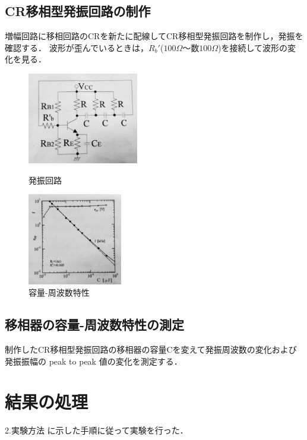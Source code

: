 \documentclass[10pt, a4j, dvipdfmx]{jarticle}
\begin{document}
      \subsection*{CR移相型発振回路の制作}
      増幅回路に移相回路のCRを新たに配線してCR移相型発振回路を制作し，発振を確認する．
      波形が歪んでいるときは，$R_b'$($100\Omega$〜数$100\Omega$)を接続して波形の変化を見る．
      \begin{figure}[H]
        \begin{minipage}{0.5\hsize}
          \centering
          \includegraphics[height=40mm]{txt-4.jpg}
          \caption{発振回路}
        \end{minipage}
        \begin{minipage}{0.5\hsize}
          \centering
          \includegraphics[height=40mm]{txt-5.jpg}
          \caption{容量-周波数特性}
        \end{minipage}
      \end{figure}

      \subsection*{移相器の容量-周波数特性の測定}
      制作したCR移相型発振回路の移相器の容量Cを変えて発振周波数の変化および発振振幅の peak to peak 値の変化を測定する．

      \section{結果の処理}
      2.実験方法 に示した手順に従って実験を行った．
\end{document}
